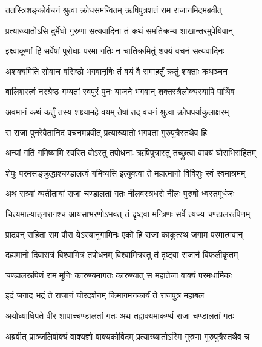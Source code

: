 
\twolineshloka
{ततस्त्रिशङ्कोर्वचनं श्रुत्वा क्रोधसमन्वितम्}
{ऋषिपुत्रशतं राम राजानमिदमब्रवीत्} %

\twolineshloka
{प्रत्याख्यातोऽसि दुर्मेधो गुरुणा सत्यवादिना}
{तं कथं समतिक्रम्य शाखान्तरमुपेयिवान्} %

\twolineshloka
{इक्ष्वाकूणां हि सर्वेषां पुरोधाः परमा गतिः}
{न चातिक्रमितुं शक्यं वचनं सत्यवादिनः} %

\twolineshloka
{अशक्यमिति सोवाच वसिष्ठो भगवानृषिः}
{तं वयं वै समाहर्तुं क्रतुं शक्ताः कथञ्चन} %

\twolineshloka
{बालिशस्त्वं नरश्रेष्ठ गम्यतां स्वपुरं पुनः}
{याजने भगवान् शक्तस्त्रैलोक्यस्यापि पार्थिव} %

\twolineshloka
{अवमानं कथं कर्तुं तस्य शक्ष्यामहे वयम्}
{तेषां तद् वचनं श्रुत्वा क्रोधपर्याकुलाक्षरम्} %

\twolineshloka
{स राजा पुनरेवैतानिदं वचनमब्रवीत्}
{प्रत्याख्यातो भगवता गुरुपुत्रैस्तथैव हि} %

\twolineshloka
{अन्यां गतिं गमिष्यामि स्वस्ति वोऽस्तु तपोधनाः}
{ऋषिपुत्रास्तु तच्छ्रुत्वा वाक्यं घोराभिसंहितम्} %

\twolineshloka
{शेपुः परमसङ्क्रुद्धाश्चण्डालत्वं गमिष्यसि}
{इत्युक्त्वा ते महात्मानो विविशुः स्वं स्वमाश्रमम्} %

\twolineshloka
{अथ रात्र्यां व्यतीतायां राजा चण्डालतां गतः}
{नीलवस्त्रधरो नीलः पुरुषो ध्वस्तमूर्धजः} %

\twolineshloka
{चित्यमाल्याङ्गरागश्च आयसाभरणोऽभवत्}
{तं दृष्ट्वा मन्त्रिणः सर्वे त्यज्य चण्डालरूपिणम्} %

\twolineshloka
{प्राद्रवन् सहिता राम पौरा येऽस्यानुगामिनः}
{एको हि राजा काकुत्स्थ जगाम परमात्मवान्} %

\twolineshloka
{दह्यमानो दिवारात्रं विश्वामित्रं तपोधनम्}
{विश्वामित्रस्तु तं दृष्ट्वा राजानं विफलीकृतम्} %

\twolineshloka
{चण्डालरूपिणं राम मुनिः कारुण्यमागतः}
{कारुण्यात् स महातेजा वाक्यं परमधार्मिकः} %

\twolineshloka
{इदं जगाद भद्रं ते राजानं घोरदर्शनम्}
{किमागमनकार्यं ते राजपुत्र महाबल} %

\twolineshloka
{अयोध्याधिपते वीर शापाच्चण्डालतां गतः}
{अथ तद्वाक्यमाकर्ण्य राजा चण्डालतां गतः} %

\twolineshloka
{अब्रवीत् प्राञ्जलिर्वाक्यं वाक्यज्ञो वाक्यकोविदम्}
{प्रत्याख्यातोऽस्मि गुरुणा गुरुपुत्रैस्तथैव च} %

